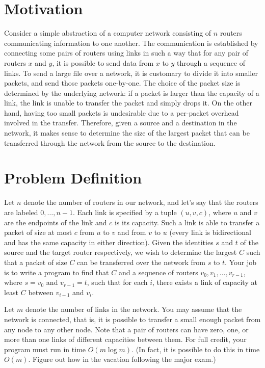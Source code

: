 \documentclass{article}
\begin{document}
\section*{Motivation}
Consider a simple abstraction of a computer network consisting of $n$ routers communicating information to one another. The communication is established by connecting some pairs of routers using links in such a way that for any pair of routers $x$ and $y$, it is possible to send data from $x$ to $y$ through a sequence of links. To send a large file over a network, it is customary to divide it into smaller packets, and send those packets one-by-one. The choice of the packet size is determined by the underlying network: if a packet is larger than the capacity of a link, the link is unable to transfer the packet and simply drops it. On the other hand, having too small packets is undesirable due to a per-packet overhead involved in the transfer. Therefore, given a source and a destination in the network, it makes sense to determine the size of the largest packet that can be transferred through the network from the source to the destination.

\section*{Problem Definition}
Let $n$ denote the number of routers in our network, and let’s say that the routers are labeled $0, \dots, n - 1$. Each link is specified by a tuple $(u, v, c)$, where $u$ and $v$ are the endpoints of the link and $c$ is its capacity. Such a link is able to transfer a packet of size at most $c$ from $u$ to $v$ and from $v$ to $u$ (every link is bidirectional and has the same capacity in either direction). Given the identities $s$ and $t$ of the source and the target router respectively, we wish to determine the largest $C$ such that a packet of size $C$ can be transferred over the network from $s$ to $t$. Your job is to write a program to find that $C$ and a sequence of routers $v_0, v_1, \dots, v_{r-1}$, where $s = v_0$ and $v_{r-1} = t$, such that for each $i$, there exists a link of capacity at least $C$ between $v_{i-1}$ and $v_i$.

Let $m$ denote the number of links in the network. You may assume that the network is connected, that is, it is possible to transfer a small enough packet from any node to any other node. Note that a pair of routers can have zero, one, or more than one links of different capacities between them. For full credit, your program must run in time $O(m \log m)$. (In fact, it is possible to do this in time $O(m)$. Figure out how in the vacation following the major exam.)
\end{document}
